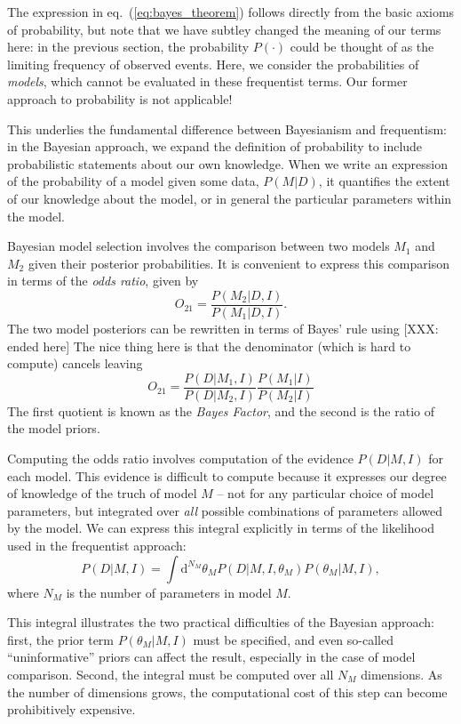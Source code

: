 \documentclass[12pt]{article}
\newcommand{\comment}[1]{{\color{red} [#1]}}
\newcommand{\dd}{\mathrm{d}}
\newcommand{\eqn}[1]{eq.~(\ref{eq:#1})}
\begin{document}
The expression in \eqn{bayes_theorem} follows directly from the basic axioms
of probability, but note that
we have subtley changed the meaning of our terms here:
in the previous section, the probability
$P(\cdot)$ could be thought of as the limiting frequency of observed events.
Here, we consider the probabilities of {\it models}, which cannot be evaluated
in these frequentist terms.
Our former approach to probability is not applicable!

This underlies the fundamental difference between Bayesianism and frequentism:
in the Bayesian approach, we expand the definition of probability to include
probabilistic statements about our own knowledge.  When we write an expression
of the probability of a model given some data, $P(M|D)$, it quantifies the
extent of our knowledge about the model, or in general the particular
parameters within the model.

Bayesian model selection involves the comparison between two models $M_1$
and $M_2$ given their posterior probabilities.  It is convenient to express
this comparison in terms of the {\it odds ratio}, given by
\begin{equation}
  \label{eq:odds_ratio}
  O_{21} = \frac{P(M_2|D,I)}{P(M_1|D,I)}.
\end{equation}
The two model posteriors can be rewritten in terms of Bayes' rule using
\comment{XXX: ended here}
The nice thing here is that the denominator (which is hard to compute) cancels
leaving
\begin{equation}
  O_{21} = \frac{P(D|M_1,I)}{P(D|M_2,I)}\frac{P(M_1|I)}{P(M_2|I)}
\end{equation}
The first quotient is known as the {\it Bayes Factor}, and the second is the
ratio of the model priors.

Computing the odds ratio involves computation of the evidence $P(D|M,I)$
for each model.  This evidence is difficult to compute because it expresses
our degree of knowledge of the truch of model $M$ -- not for any
particular choice of model parameters,
but integrated over {\it all} possible combinations of parameters allowed
by the model.  We can express this integral explicitly in terms of the
likelihood used in the frequentist approach:
\begin{equation}
  \label{eq:evidence_integral}
  P(D|M, I) = \int \dd^{N_M}\theta_M P(D|M, I, \theta_M)P(\theta_M|M, I),
\end{equation}
where $N_M$ is the number of parameters in model $M$.

This integral illustrates the two practical difficulties of the Bayesian
approach: first, the prior term $P(\theta_M|M,I)$ must be specified, and
even so-called ``uninformative'' priors can affect the result, especially
in the case of model comparison.  Second, the integral must be computed
over all $N_M$ dimensions.
As the number of dimensions grows, the computational cost of this step
can become prohibitively expensive.
\end{document}
